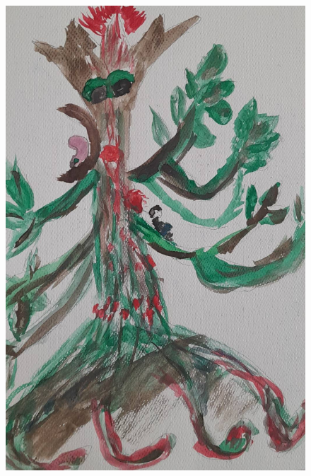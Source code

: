 \documentclass[12pt, a4paper, twoside]{book} %
\begin{document}
\begin{figure}[H]
	\centering
	\includegraphics[width=\textwidth]{./images/1f81324df17c98.jpg}
\end{figure}
\end{document}
